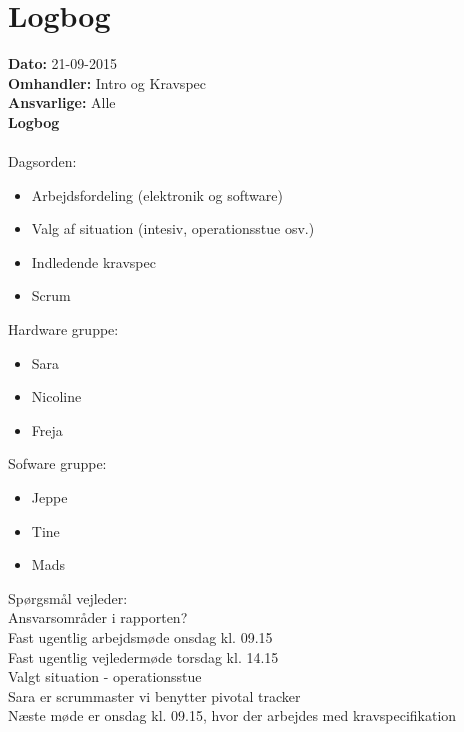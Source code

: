\chapter{Logbog}

\textbf{Dato:} 21-09-2015\\
\textbf{Omhandler:} Intro og Kravspec\\
\textbf{Ansvarlige:} Alle\\

\textbf{Logbog}
\\
\\
Dagsorden:
\begin{itemize}
	\item Arbejdsfordeling (elektronik og software)
	\item Valg af situation (intesiv, operationsstue osv.)
	\item Indledende kravspec
	\item Scrum
\end{itemize}

Hardware gruppe:
\begin{itemize}
	\item Sara
	\item Nicoline
	\item Freja
\end{itemize}

Sofware gruppe:
\begin{itemize}
	\item Jeppe 
	\item Tine
	\item Mads
\end{itemize}

Spørgsmål vejleder: \\
Ansvarsområder i rapporten?\\
Fast ugentlig arbejdsmøde onsdag kl. 09.15\\
Fast ugentlig vejledermøde torsdag kl. 14.15\\

Valgt situation - operationsstue\\
Sara er scrummaster vi benytter pivotal tracker
\\
Næste møde er onsdag kl. 09.15, hvor der arbejdes med kravspecifikation\\